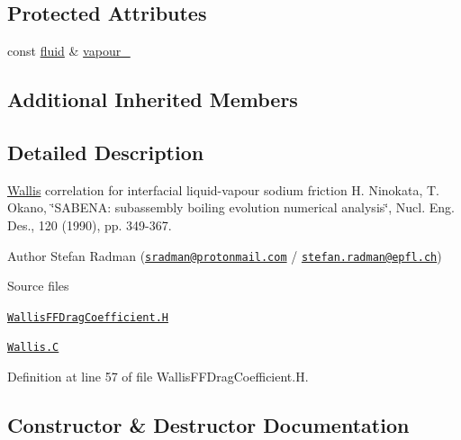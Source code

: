 \subsection*{Protected Attributes}
\begin{DoxyCompactItemize}
\item 
const \hyperlink{classFoam_1_1fluid}{fluid} \& \hyperlink{classFoam_1_1FFDragCoefficientModels_1_1Wallis_a2675e35060f71c22823e4a0b3c816dad}{vapour\+\_\+}
\end{DoxyCompactItemize}
\subsection*{Additional Inherited Members}


\subsection{Detailed Description}
\hyperlink{classFoam_1_1FFDragCoefficientModels_1_1Wallis}{Wallis} correlation for interfacial liquid-\/vapour sodium friction H. Ninokata, T. Okano, \char`\"{}\+S\+A\+B\+E\+N\+A\+: subassembly boiling evolution numerical 
analysis\char`\"{}, Nucl. Eng. Des., 120 (1990), pp. 349-\/367. 

\label{_Description}%
 Author Stefan Radman (\href{mailto:sradman@protonmail.com}{\tt sradman@protonmail.\+com} / \href{mailto:stefan.radman@epfl.ch}{\tt stefan.\+radman@epfl.\+ch})

\begin{DoxyParagraph}{Source files}

\begin{DoxyItemize}
\item \href{../../../home/carlo/data/GeN-Foam/GeN-Foam_ffn/GeN-Foam/GeN-Foam/classes/thermalHydraulics/src/physicsModels/dragModels/FFDragCoefficientModels/Wallis/WallisFFDragCoefficient.H}{\tt Wallis\+F\+F\+Drag\+Coefficient.\+H} 
\item \href{../../../home/carlo/data/GeN-Foam/GeN-Foam_ffn/GeN-Foam/GeN-Foam/classes/thermalHydraulics/src/physicsModels/dragModels/FFDragCoefficientModels/Wallis/Wallis.C}{\tt Wallis.\+C} 
\end{DoxyItemize}
\end{DoxyParagraph}


Definition at line 57 of file Wallis\+F\+F\+Drag\+Coefficient.\+H.



\subsection{Constructor \& Destructor Documentation}
\mbox{\label{classFoam_1_1FFDragCoefficientModels_1_1Wallis_ad5f4b37daf5871be11d78b4a594fa1a9}} 
